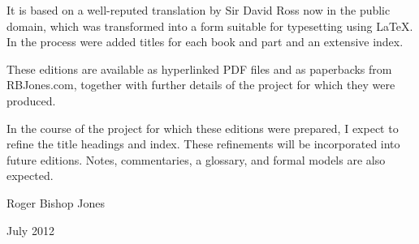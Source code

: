 It is based on a well-reputed translation by Sir David Ross now in the public domain, which was transformed into a form suitable for typesetting using {\LaTeX}.
In the process were added titles for each book and part and an extensive index.

These editions are available as hyperlinked PDF files and as paperbacks from RBJones.com, together with further details of the project for which they were produced.

In the course of the project for which these editions were prepared, I expect to refine the title headings and index.
These refinements will be incorporated into future editions.
Notes, commentaries, a glossary, and formal models are also expected.

Roger Bishop Jones

July 2012

\mainmatter

\renewcommand{\aref}{\thechapter\ Part \arabic{section}}



\backmatter
%
%




\renewcommand{\aref}{}
\renewcommand{\bookname}{}
\renewcommand{\chaptermark}[1]{}
\renewcommand{\sectionmark}[1]{}

\printindex

\vfil



